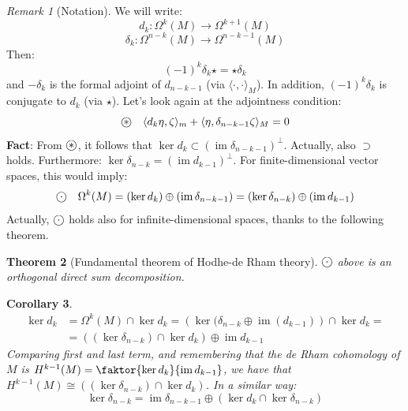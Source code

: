 \documentclass[a4paper,11pt,titlepage, article, oneside]{memoir}
\numberwithin{equation}{section}
\newtheorem{theorem}{Theorem}[section]
\newtheorem{corollary}[theorem]{Corollary}
\theoremstyle{definition}
\theoremstyle{remark}
\newtheorem{remark}[theorem]{Remark}
\DeclareMathOperator{\im}{im}
\newcommand\oast{\stackMath\mathbin{\stackinset{c}{0ex}{c}{0ex}{\ast}{\bigcirc}}}
\newcommand\ocdot{\stackMath\mathbin{\stackinset{c}{0ex}{c}{0ex}{\cdot}{\bigcirc}}}
\begin{document}
\begin{remarkbox}\begin{remark}[Notation]
We will write:
$$d_k \colon \Omega^k(M) \rightarrow \Omega^{k+1}(M)$$
$$\delta_k \colon \Omega^{n-k}(M) \rightarrow \Omega^{n-k-1} (M)$$
Then: 
$$(-1)^k \delta_k \star = \star \delta_k$$
and $-\delta_k$ is the formal adjoint of $d_{n-k-1}$ (via $\langle \cdot, \cdot \rangle_M$).  In addition, $(-1)^k \delta_k$ is conjugate to $d_k$ (via $\star$).
Let's look again at the adjointness condition:
\begin{equation} \label{adjcondition}
\oast \quad \langle d_k \eta, \zeta \rangle _m + \langle \eta, \delta_{n-k-1} \zeta \rangle _M = 0
\end{equation}
\textbf{Fact}: From $\oast$, it follows that $\ker d_k \subset (\im \delta_{n-k-1})^{\bot}$. Actually, also $\supset$ holds. Furthermore: $\ker \delta_{n-k} = (\im d_{k-1})^{\bot}$.
For finite-dimensional vector spaces, this would imply:
\begin{equation}
\ocdot \quad \Omega^k(M) = (\ker d_k) \oplus (\im \delta_{n-k-1}) = (\ker \delta_{n-k}) \oplus (\im d_{k-1})
\end{equation}
Actually, $\ocdot$ holds also for infinite-dimensional spaces, thanks to the following theorem.
\end{remark}\end{remarkbox}

\begin{theorem}[Fundamental theorem of Hodhe-de Rham theory]
$\ocdot$ above is an orthogonal direct sum decomposition.
\end{theorem}

\begin{corollary}
\begin{align}
\ker d_k &= \Omega^k(M) \cap \ker d_k = \left ( \ker (\delta_{n-k} \oplus \im(d_{k-1}) \right ) \cap \ker d_k = \\
&= \left ( (\ker \delta_{n-k}) \cap \ker d_k \right) \oplus \im d_{k-1} \nonumber
\end{align}
Comparing first and last term, and remembering that the de Rham cohomology of $M$ is $H^{k-1}(M) = \faktor{\ker d_k}{\im d_{k-1}}$, we have that $H^{k-1}(M) \cong \left ( (\ker \delta_{n-k}) \cap \ker d_k \right)$. In a similar way:
\begin{equation}
\ker \delta_{n-k} = \im \delta_{n-k-1} \oplus \left ( \ker d_k \cap \ker \delta _{n-k} \right )
\end{equation}
\end{corollary}
\end{document}
